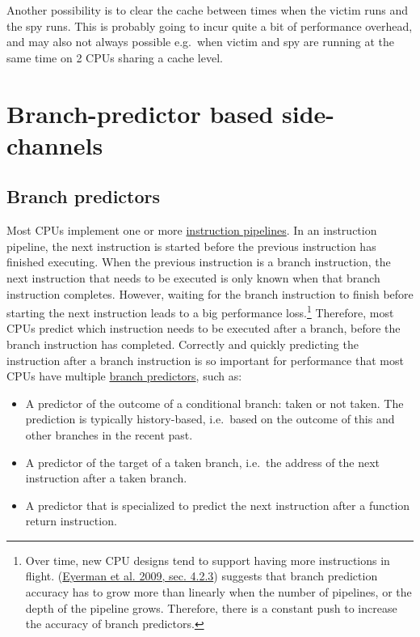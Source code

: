 \documentclass[
  a4paper,
]{report}
\providecommand{\tightlist}{%
  \setlength{\itemsep}{0pt}\setlength{\parskip}{0pt}}
\begin{document}
Another possibility is to clear the cache between times when the victim
runs and the spy runs. This is probably going to incur quite a bit of
performance overhead, and may also not always possible e.g.~when victim
and spy are running at the same time on 2 CPUs sharing a cache level.

\hypertarget{branch-predictor-based-side-channels}{%
\section{Branch-predictor based
side-channels}\label{branch-predictor-based-side-channels}}

\hypertarget{branch-predictors}{%
\subsection{Branch predictors}\label{branch-predictors}}

Most CPUs implement one or more
\href{https://en.wikipedia.org/wiki/Instruction_pipelining}{instruction
pipelines}.  In an
instruction pipeline, the next instruction is started before the
previous instruction has finished executing. When the previous
instruction is a branch instruction, the next instruction that needs to
be executed is only known when that branch instruction completes.
However, waiting for the branch instruction to finish before starting
the next instruction leads to a big performance loss.\footnote{Over
  time, new CPU designs tend to support having more instructions in
  flight. (\protect\hyperlink{ref-Eyerman2009}{Eyerman et al. 2009, sec.
  4.2.3}) suggests that branch prediction accuracy has to grow more than
  linearly when the number of pipelines, or the depth of the pipeline
  grows. Therefore, there is a constant push to increase the accuracy of
  branch predictors.} Therefore, most CPUs predict which
instruction needs to be executed after a branch, before the branch
instruction has completed. Correctly and quickly predicting the
instruction after a branch instruction is so important for performance
that most CPUs have multiple
\href{https://en.wikipedia.org/wiki/Branch_predictor}{branch
predictors}, such as:

\begin{itemize}
\tightlist
\item
  A predictor of the outcome of a conditional
  branch: taken or not taken. The
  prediction is typically history-based,
  i.e.~based on the outcome of this and other branches in the recent
  past.
\item
  A predictor of the target of a taken
  branch, i.e.~the address of the next
  instruction after a taken branch.
\item
  A predictor that is specialized to predict the next instruction after
  a function return instruction.
\end{itemize}
\end{document}
